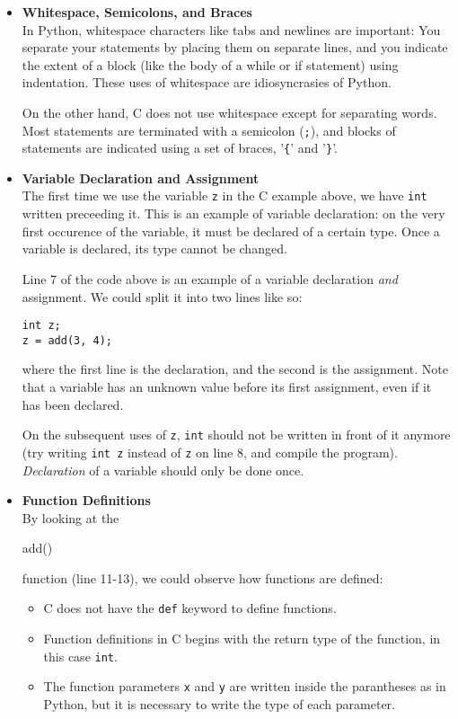 \begin{itemize}
\item \textbf{Whitespace, Semicolons, and Braces}\\
In Python, whitespace characters like tabs and newlines are important: You separate your statements by placing them on separate lines, and you indicate the extent of a block (like the body of a while or if statement) using indentation. These uses of whitespace are idiosyncrasies of Python.

On the other hand, C does not use whitespace except for separating words. Most statements are terminated with a semicolon (\verb|;|), and blocks of statements are indicated using a set of braces, '\verb|{|' and '\verb|}|'.

\item \textbf{Variable Declaration and Assignment} \\
The first time we use the variable \verb|z| in the C example above, we have \verb|int| written preceeding it. This is an example of variable declaration: on the very first occurence of the variable, it must be declared of a certain type. Once a variable is declared, its type cannot be changed.

Line 7 of the code above is an example of a variable declaration \textit{and} assignment. We could split it into two lines like so:
\begin{verbatim}
int z;
z = add(3, 4);
\end{verbatim}
where the first line is the declaration, and the second is the assignment. Note that a variable has an unknown value before its first assignment, even if it has been declared.

On the subsequent uses of \verb|z|, \verb|int| should not be written in front of it anymore (try writing \verb|int z| instead of \verb|z| on line 8, and compile the program). \textit{Declaration} of a variable should only be done once. 

\item \textbf{Function Definitions} \\
By looking at the \begin{typewriter}add()\end{typewriter} function (line 11-13), we could observe how functions are defined:
\begin{itemize}
    \item C does not have the \verb|def| keyword to define functions.
    \item Function definitions in C begins with the return type of the function, in this case \verb|int|.
    \item The function parameters \verb|x| and \verb|y| are written inside the parantheses as in Python, but it is necessary to write the type of each parameter.
\end{itemize}


\end{itemize}
